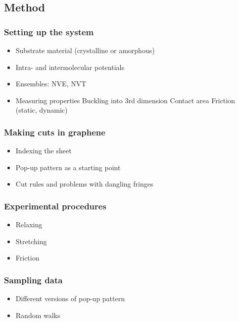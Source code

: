 \documentclass[UKenglish]{book}
\begin{document}
\subsection*{Method}
\subsubsection*{Setting up the system}
\begin{itemize}
  \item Substrate material (crystalline or amorphous)
  \item Intra- and intermolecular potentials
  \item Ensembles: NVE, NVT
  \item Measuring properties
  \subitem Buckling into 3rd dimension 
  \subitem Contact area
  \subitem Friction (static, dynamic)
\end{itemize}

\subsubsection*{Making cuts in graphene}
\begin{itemize}
  \item Indexing the sheet
  \item Pop-up pattern as a starting point
  \item Cut rules and problems with dangling fringes 
\end{itemize}

\subsubsection*{Experimental procedures}
\begin{itemize}
  \item Relaxing
  \item Stretching 
  \item Friction 
\end{itemize}

\subsubsection*{Sampling data}
\begin{itemize}
  \item Different versions of pop-up pattern 
  \item Random walks 
\end{itemize}
\end{document}
